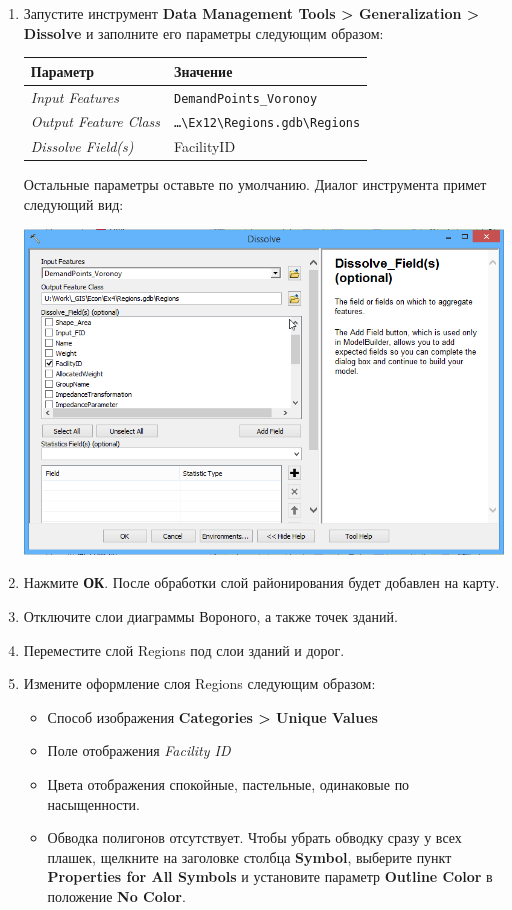 \documentclass[]{book}
\theoremstyle{definition}
\theoremstyle{definition}
\theoremstyle{definition}
\theoremstyle{remark}
\begin{document}
\begin{enumerate}
\def\labelenumi{\arabic{enumi}.}
\item
  Запустите инструмент \textbf{Data Management Tools \textgreater{}
  Generalization \textgreater{} Dissolve} и заполните его параметры
  следующим образом:

  \begin{longtable}[]{@{}ll@{}}
  \toprule
  Параметр & Значение\tabularnewline
  \midrule
  \endhead
  \emph{Input Features} & \texttt{DemandPoints\_Voronoy}\tabularnewline
  \emph{Output Feature Class} &
  \texttt{\ldots{}\textbackslash{}Ex12\textbackslash{}Regions.gdb\textbackslash{}Regions}\tabularnewline
  \emph{Dissolve Field(s)} & FacilityID\tabularnewline
  \bottomrule
  \end{longtable}

  Остальные параметры оставьте по умолчанию. Диалог инструмента примет
  следующий вид:

  \includegraphics{images/Ex12/image31.png}
\item
  Нажмите \textbf{ОК}. После обработки слой районирования будет добавлен
  на карту.
\item
  Отключите слои диаграммы Вороного, а также точек зданий.
\item
  Переместите слой Regions под слои зданий и дорог.
\item
  Измените оформление слоя Regions следующим образом:

  \begin{itemize}
  \item
    Способ изображения \textbf{Categories \textgreater{} Unique Values}
  \item
    Поле отображения \emph{Facility ID}
  \item
    Цвета отображения спокойные, пастельные, одинаковые по насыщенности.
  \item
    Обводка полигонов отсутствует. Чтобы убрать обводку сразу у всех
    плашек, щелкните на заголовке столбца \textbf{Symbol}, выберите
    пункт \textbf{Properties for All Symbols} и установите параметр
    \textbf{Outline Color} в положение \textbf{No Color}.
  \end{itemize}


\end{enumerate}
\end{document}
